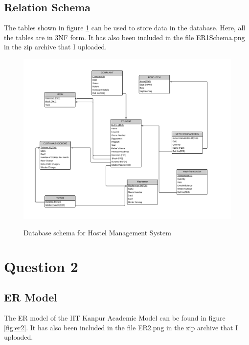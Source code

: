 \documentclass[12pt]{article}%
\begin{document}
\subsection{Relation Schema}
The tables shown in figure \ref{fig:erschema} can be used to store data in the database. Here, all the tables are in 3NF form. It has also been included in the file ER1Schema.png in the zip archive that I uploaded. 

\begin{figure}
\includegraphics[width=\textwidth]{ER1Schema.png}
\label{fig:erschema}
\caption{Database schema for Hostel Management System}
\end{figure}

\section{Question 2}
\subsection{ER Model}
The ER model of the IIT Kanpur Academic Model  can be found in figure \ref{fig:er2}.
It has also been included in the file ER2.png in the zip archive that I uploaded. 
\end{document}
